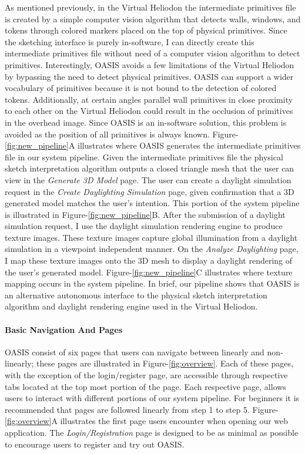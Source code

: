 As mentioned previously, in the Virtual Heliodon the intermediate primitives file is created by a simple computer vision algorithm that detects walls, windows, and tokens through colored markers placed on the top of physical primitives.  Since the sketching interface is purely in-software, I can directly create this intermediate primitives file without need of a computer vision algorithm to detect primitives.  Interestingly, OASIS avoids a few limitations of the Virtual Heliodon by bypassing the need to detect physical primitives.  OASIS can support a wider vocabulary of primitives because it is not bound to the detection of colored tokens.  Additionally, at certain angles parallel wall primitives in close proximity to each other on the Virtual Heliodon could result in the occlusion of primitives in the overhead image.  Since OASIS is an in-software solution, this problem is avoided as the position of all primitives is always known.  Figure-\ref{fig:new_pipeline}A illustrates where OASIS generates the intermediate primitives file in our system pipeline.  Given the intermediate primitives file the physical sketch interpretation algorithm outputs a closed triangle mesh that the user can view in the \textit{Generate 3D Model} page.  The user can create a daylight simulation request in the \textit{Create Daylighting Simulation} page, given confirmation that a 3D generated model matches the user's intention.  This portion of the system pipeline is illustrated in Figure-\ref{fig:new_pipeline}B.  After the submission of a daylight simulation request, I use the daylight simulation rendering engine to produce texture images.  These texture images capture global illumination from a daylight simulation in a viewpoint independent manner.  On the \textit{Analyze Daylighting} page, I map these texture images onto the 3D mesh to display a daylight rendering of the user's generated model.  Figure-\ref{fig:new_pipeline}C illustrates where texture mapping occurs in the system pipeline.  In brief, our pipeline shows that OASIS is an alternative autonomous interface to the physical sketch interpretation algorithm and daylight rendering engine used in the Virtual Heliodon.  \\


\paragraph{Basic Navigation And Pages}

OASIS consist of six pages that users can navigate between linearly and non-linearly; these pages are illustrated in Figure-\ref{fig:overview}.  Each of these pages, with the exception of the login/register page, are accessible through respective tabs located at the top most portion of the page.  Each respective page, allows users to interact with different portions of our system pipeline.  For beginners it is recommended that pages are followed linearly from step 1 to step 5.  Figure-\ref{fig:overview}A illustrates the first page users encounter when opening our web application.  The \textit{Login/Registration} page is designed to be as minimal as possible to encourage users to register and try out OASIS.  \\ 

